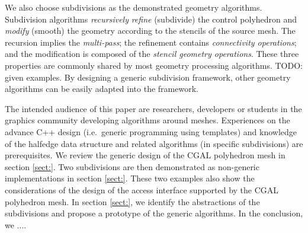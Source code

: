 We also choose subdivisions as the demonstrated geometry algorithms.
Subdivision algorithms \emph{recursively} \emph{refine} (subdivide) 
the control polyhedron and \emph{modify} (smooth) the geometry
according to the stencils of the source mesh. The 
recursion implies the \emph{multi-pass}; the refinement
contains \emph{connectivity operations}; and the modification
is composed of the \emph{stencil geometry operations}.
These three properties are commonly shared by most geometry processing
algorithms. TODO: given examples.
By designing a generic subdivision framework,
other geometry algorithms can be easily adapted into
the framework.

The intended audience of this paper are researchers, 
developers or students in the graphics community developing 
algorithms around meshes. Experiences on the advance C++
design (i.e.\ generic programming using templates) and
knowledge of the halfedge data structure and related
algorithms (in specific subdivisions) are prerequisites. 
We review the generic design of the CGAL 
polyhedron mesh in section \ref{sect:}. Two subdivisions are then
demonstrated as non-generic implementations in section \ref{sect:}.
These two examples also show the considerations of the
design of the access interface supported by the CGAL polyhedron
mesh. In section \ref{sect:}, we identify the abstractions of
the subdivisions and propose a prototype of the generic
algorithms. In the conclusion, we ....








